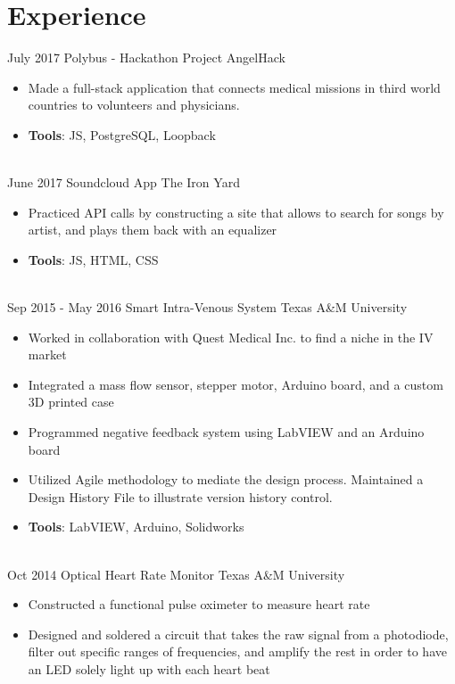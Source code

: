 \documentclass[letterpaper]{twentysecondcv} %
\begin{document}
\section{Experience}

\begin{twenty} %
\twentyitem
    	{July 2017}
		{}
        {Polybus - Hackathon Project}
        {AngelHack}
        {}
        {\begin{itemize}
        \item Made a full-stack application that connects medical missions in third world countries to volunteers and physicians.
        \item \textbf{Tools}: JS, PostgreSQL, Loopback
        \end{itemize}}
        \\
        \twentyitem
    	{June 2017}
		{}
        {Soundcloud App}
        {The Iron Yard}
        {}
        {\begin{itemize}
        \item Practiced API calls by constructing a site that allows to search for songs by artist, and plays them back with an equalizer
        \item \textbf{Tools}: JS, HTML, CSS
        \end{itemize}}
        \\
\twentyitem
    	{Sep 2015 -}
		{May 2016}
        {Smart Intra-Venous System}
        {{Texas A\&M University}}
        {}
        {\begin{itemize}
        \item Worked in collaboration with Quest Medical Inc. to find a niche in the IV market
        \item Integrated a mass flow sensor, stepper motor, Arduino board, and a custom 3D printed case
        \item Programmed negative feedback system using LabVIEW and an Arduino board
        \item Utilized Agile methodology to mediate the design process. Maintained a Design History File to illustrate version history control.
        \item \textbf{Tools}: LabVIEW, Arduino, Solidworks
        \end{itemize}}
        \\
	\twentyitem
    	{Oct 2014}
		{}
        {Optical Heart Rate Monitor}
        {Texas A\&M University}
        {}
        {
        {\begin{itemize}
        \item Constructed a functional pulse oximeter to measure heart rate
        \item Designed and soldered a circuit that takes the raw signal from a photodiode, filter out specific ranges of frequencies, and amplify the rest in order to have an LED solely light up with each heart beat
        \\
    \end{itemize}}
        }
        
\end{twenty}
\end{document}

